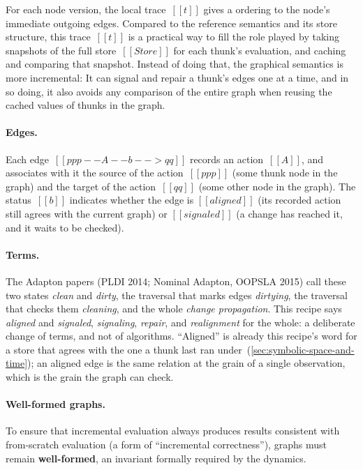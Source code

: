 \documentclass[11pt]{article}
\begin{document}
For each node version, the local trace~$[[t]]$ gives a ordering to the node's immediate outgoing edges.
%
Compared to the reference semantics and its store structure, this
trace~$[[t]]$ is a practical way to fill the role played by taking
snapshots of the full store~$[[Store]]$ for each thunk's evaluation,
and caching and comparing that snapshot.
%
Instead of doing that, the graphical semantics is more incremental:
It can signal and repair a thunk's edges one at a time, and in so doing, it also avoids any comparison of the entire graph
when reusing the cached values of thunks in the graph.

\ottgrammartabular{
  \ottnode
  \\
  \ottcache
  \\
  \ottt
}

\paragraph{Edges.}
Each edge~$[[ppp --A--b--> qq]]$ records an action~$[[A]]$, and
associates with it the source of the action~$[[ppp]]$ (some thunk node
in the graph) and the target of the action~$[[qq]]$ (some other node
in the graph).
%
The status~$[[b]]$ indicates whether the edge is $[[aligned]]$ (its
recorded action still agrees with the current graph) or $[[signaled]]$ (a
change has reached it, and it waits to be checked).

\paragraph{Terms.}
The Adapton papers (PLDI 2014; Nominal Adapton, OOPSLA 2015) call these two
states \emph{clean} and \emph{dirty}, the traversal that marks edges
\emph{dirtying}, the traversal that checks them \emph{cleaning}, and the
whole \emph{change propagation}.
%
This recipe says \emph{aligned} and \emph{signaled}, \emph{signaling},
\emph{repair}, and \emph{realignment} for the whole: a deliberate change of
terms, and not of algorithms.
%
``Aligned'' is already this recipe's word for a store that agrees with the
one a thunk last ran under~(\cref{sec:symbolic-space-and-time}); an aligned
edge is the same relation at the grain of a single observation, which is
the grain the graph can check.

\ottgrammartabular{
  \ottedge
  \\
  \ottA
  \\
  \ottb
}


\paragraph{Well-formed graphs.}
To ensure that incremental evaluation always produces results
consistent with from-scratch evaluation (a form of ``incremental
correctness''), graphs must remain \textbf{well-formed}, an invariant
formally required by the dynamics.
\end{document}
